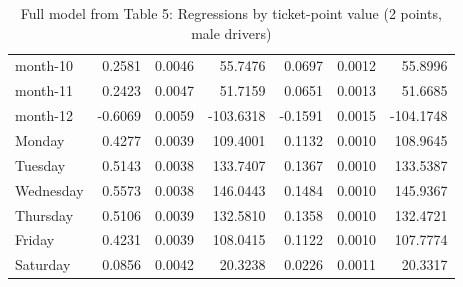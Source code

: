 \documentclass[10pt]{article}
\begin{document}
\begin{table}[ht]
\begin{tabular}{lrrrrrr}
  month-10 & 0.2581 & 0.0046 & 55.7476 & 0.0697 & 0.0012 & 55.8996 \\ 
  month-11 & 0.2423 & 0.0047 & 51.7159 & 0.0651 & 0.0013 & 51.6685 \\ 
  month-12 & -0.6069 & 0.0059 & -103.6318 & -0.1591 & 0.0015 & -104.1748 \\ 
  Monday & 0.4277 & 0.0039 & 109.4001 & 0.1132 & 0.0010 & 108.9645 \\ 
  Tuesday & 0.5143 & 0.0038 & 133.7407 & 0.1367 & 0.0010 & 133.5387 \\ 
  Wednesday & 0.5573 & 0.0038 & 146.0443 & 0.1484 & 0.0010 & 145.9367 \\ 
  Thursday & 0.5106 & 0.0039 & 132.5810 & 0.1358 & 0.0010 & 132.4721 \\ 
  Friday & 0.4231 & 0.0039 & 108.0415 & 0.1122 & 0.0010 & 107.7774 \\ 
  Saturday & 0.0856 & 0.0042 & 20.3238 & 0.0226 & 0.0011 & 20.3317 \\ 
   \hline
\end{tabular}
\caption{Full model from Table 5: Regressions by ticket-point value (2 points, male drivers)} 
\label{tab_5_2_pts_no_age_M}
\end{table}


\clearpage
\pagebreak



\end{document}
